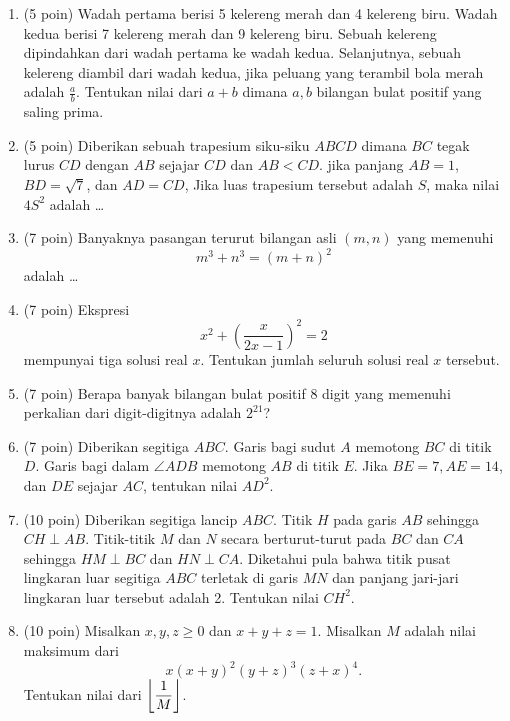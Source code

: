 \documentclass[11pt]{scrartcl}
\begin{document}
\begin{enumerate}
	    \item (5 poin) Wadah pertama berisi 5 kelereng merah dan 4 kelereng biru. Wadah kedua berisi 7 kelereng merah dan
		9 kelereng biru. Sebuah kelereng dipindahkan dari wadah pertama ke wadah kedua. Selanjutnya, sebuah
		kelereng diambil dari wadah kedua, jika peluang yang terambil bola merah adalah
		$\frac{a}{b}$. Tentukan nilai dari $a+b$ dimana $a, b$ bilangan bulat positif yang saling prima.
	    
	    \item (5 poin) Diberikan sebuah trapesium siku-siku $ABCD$ dimana $BC$ tegak lurus $CD$ dengan $AB$ sejajar $CD$ dan $AB < CD$. jika panjang $AB = 1$, $BD = \sqrt{7}$, dan $AD = CD$, Jika luas trapesium tersebut adalah $S$, maka nilai $4S^2$ adalah \dots
	    
	    \item (7 poin) Banyaknya pasangan terurut bilangan asli $(m,n)$ yang memenuhi $$m^3+n^3=(m+n)^2$$ adalah \dots
	    
	    \item (7 poin) Ekspresi $$x^2+\left(\dfrac{x}{2x-1}\right)^2=2$$ mempunyai tiga solusi real $x$. Tentukan jumlah seluruh solusi real $x$ tersebut.
	    
	    \item (7 poin) Berapa banyak bilangan bulat positif 8 digit yang memenuhi perkalian dari digit-digitnya adalah $2^{21}$?
	    
	    \item (7 poin) Diberikan segitiga $ABC$. Garis bagi sudut $A$ memotong $BC$ di titik $D$. Garis bagi dalam $\angle ADB$ memotong $AB$ di titik $E$. Jika $BE = 7, AE = 14$, dan $DE$ sejajar $AC$, tentukan nilai $AD^2$.
	    
	    \item (10 poin) Diberikan segitiga lancip $ABC$. Titik $H$ pada garis $AB$ sehingga $CH \perp AB$. Titik-titik $M$ dan $N$ secara berturut-turut pada $BC$ dan $CA$ sehingga $HM \perp BC$ dan $HN \perp CA$. Diketahui pula bahwa titik pusat lingkaran luar segitiga $ABC$ terletak di garis $MN$ dan panjang jari-jari lingkaran luar tersebut adalah 2. Tentukan nilai $CH^2$.
	
	    \item (10 poin) Misalkan $x,y,z \ge 0$ dan $x+y+z=1$. Misalkan $M$ adalah nilai maksimum dari
	    $$x(x+y)^2(y+z)^3(z+x)^4.$$
	    Tentukan nilai dari $\left\lfloor \dfrac{1}{M} \right\rfloor$.
	    

\end{enumerate}
\end{document}

